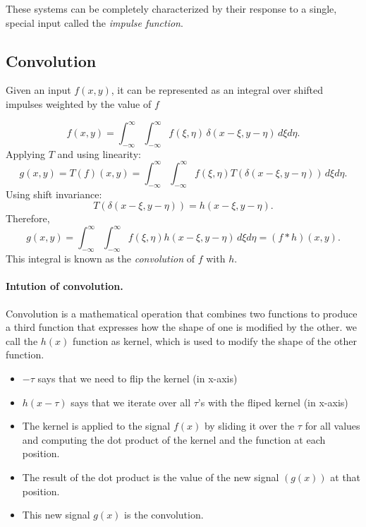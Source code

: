 These systems can be completely characterized by their response to a single, special input called the {\it impulse function}.

\subsection{Convolution}
Given an input \( f(x,y) \), it can be represented as an integral over shifted impulses weighted by the value of \( f \)

\[
f(x,y) = \int_{-\infty}^\infty \int_{-\infty}^\infty f(\xi, \eta) \, \delta(x-\xi, y-\eta) \, d\xi d\eta.
\]
Applying \( T \) and using linearity:
\[
g(x,y) = T(f)(x,y) = \int_{-\infty}^\infty \int_{-\infty}^\infty f(\xi,\eta) T(\delta(x-\xi, y-\eta)) \, d\xi d\eta.
\]
Using shift invariance:
\[
T(\delta(x-\xi, y-\eta)) = h(x-\xi, y-\eta).
\]
Therefore,
\[
g(x,y) = \int_{-\infty}^\infty \int_{-\infty}^\infty f(\xi,\eta) h(x-\xi, y-\eta) \, d\xi d\eta = (f * h)(x,y).
\]
This integral is known as the \textit{convolution} of \( f \) with \( h \).



\paragraph{Intution of convolution.} Convolution is a mathematical operation that combines two functions to produce a third function that expresses how the shape of one is modified by the other. we call the $h(x)$ function as kernel, which is used to modify the shape of the other function.
\begin{itemize}
    \item $- \tau$ says that we need to flip the kernel (in x-axis)
    \item $h(x - \tau)$ says that we iterate over all $\tau$'s with the fliped kernel (in x-axis)
    \item The kernel is applied to the signal $f(x)$ by sliding it over the $\tau$ for all values and computing the dot product of the kernel and the function at each position. 
    \item The result of the dot product is the value of the new signal $(g(x))$ at that position.
    \item This new signal $g(x)$ is the convolution.
\end{itemize}

